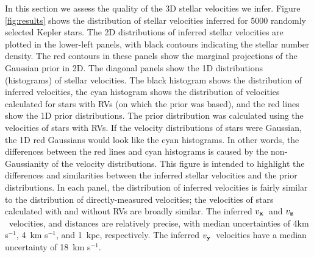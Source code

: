 \documentclass[]{aastex631}
\newcommand{\vx}{$v_{\bf x}$}
\newcommand{\vy}{$v_{\bf y}$}
\newcommand{\vz}{$v_{\bf z}$}
\newcommand{\kms}{km s$^{-1}$}
\newcommand{\vxprecision}{4}
\newcommand{\vyprecision}{18}
\newcommand{\vzprecision}{4}
\newcommand{\dprecision}{1}
\begin{document}
In this section we assess the quality of the 3D stellar velocities we infer.
Figure \ref{fig:results} shows the distribution of stellar velocities inferred
for 5000 randomly selected Kepler stars.
The 2D distributions of inferred stellar velocities are plotted in the
lower-left panels, with black contours indicating the stellar number density.
The red contours in these panels show the marginal projections of the
Gaussian prior in 2D.
The diagonal panels show the 1D distributions (histograms) of stellar
velocities.
The black histogram shows the distribution of inferred velocities, the cyan
histogram shows the distribution of velocities calculated for stars with RVs
(on which the prior was based), and the red lines show the 1D prior
distributions.
The prior distribution was calculated using the velocities of stars with RVs.
If the velocity distributions of stars were Gaussian, the 1D red Gaussians
would look like the cyan histograms.
In other words, the differences between the red lines and cyan histograms
is caused by the non-Gaussianity of the velocity distributions.
This figure is intended to highlight the differences and similarities
between the inferred stellar velocities and the prior distributions.
In each panel, the distribution of inferred velocities is fairly similar to
the distribution of directly-measured velocities; the velocities of stars
calculated with and without RVs are broadly similar.
The inferred \vx\ and \vz\ velocities, and distances are relatively
precise, with median uncertainties of \vxprecision \kms, \vzprecision\ \kms,
and \dprecision\ kpc, respectively.
The inferred \vy\ velocities have a median uncertainty of \vyprecision\ \kms.
\end{document}
